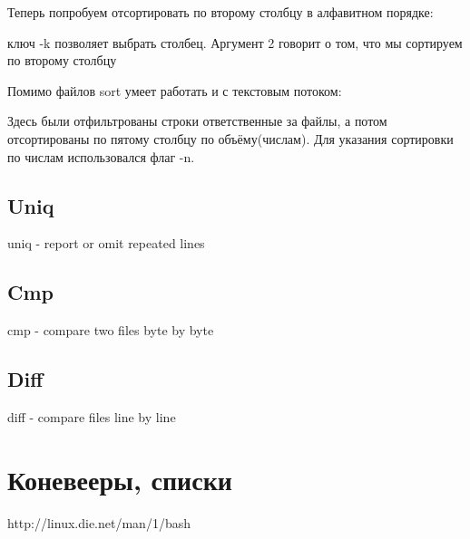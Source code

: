 \documentclass[a4paper]{article}
\begin{document}
Теперь попробуем отсортировать по второму столбцу в алфавитном порядке:

ключ -k позволяет выбрать столбец. Аргумент 2 говорит о том, что мы сортируем по второму столбцу

Помимо файлов sort умеет работать и с текстовым потоком:

Здесь были отфильтрованы строки ответственные за файлы, а потом отсортированы по пятому столбцу по объёму(числам). Для указания сортировки по числам использовался флаг -n.
\subsection{Uniq} 
uniq - report or omit repeated lines 
\subsection{Cmp}
cmp - compare two files byte by byte
\subsection{Diff}
diff - compare files line by line


 
\section{Коневееры, списки}
http://linux.die.net/man/1/bash
\end{document}
